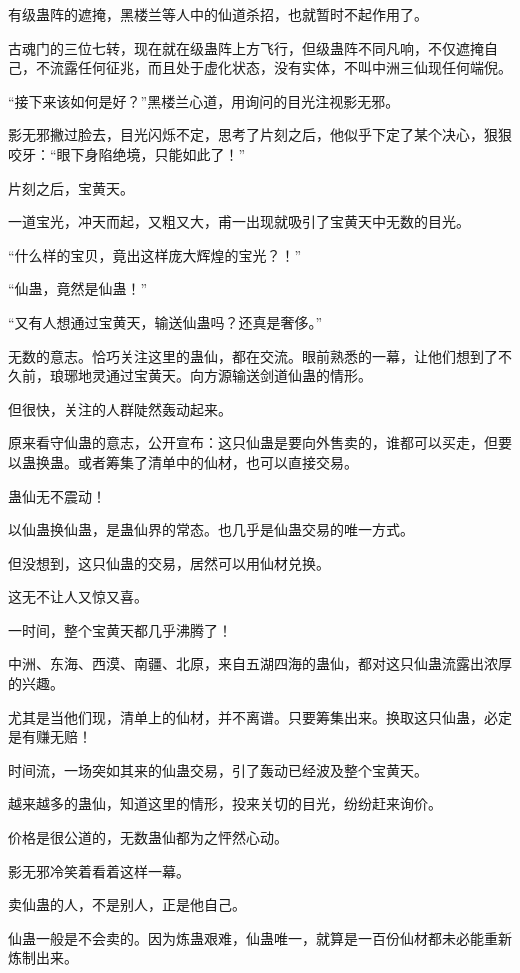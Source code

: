 \begin{this_body}
有级蛊阵的遮掩，黑楼兰等人中的仙道杀招，也就暂时不起作用了。

古魂门的三位七转，现在就在级蛊阵上方飞行，但级蛊阵不同凡响，不仅遮掩自己，不流露任何征兆，而且处于虚化状态，没有实体，不叫中洲三仙现任何端倪。

“接下来该如何是好？”黑楼兰心道，用询问的目光注视影无邪。

影无邪撇过脸去，目光闪烁不定，思考了片刻之后，他似乎下定了某个决心，狠狠咬牙：“眼下身陷绝境，只能如此了！”

片刻之后，宝黄天。

一道宝光，冲天而起，又粗又大，甫一出现就吸引了宝黄天中无数的目光。

“什么样的宝贝，竟出这样庞大辉煌的宝光？！”

“仙蛊，竟然是仙蛊！”

“又有人想通过宝黄天，输送仙蛊吗？还真是奢侈。”

无数的意志。恰巧关注这里的蛊仙，都在交流。眼前熟悉的一幕，让他们想到了不久前，琅琊地灵通过宝黄天。向方源输送剑道仙蛊的情形。

但很快，关注的人群陡然轰动起来。

原来看守仙蛊的意志，公开宣布：这只仙蛊是要向外售卖的，谁都可以买走，但要以蛊换蛊。或者筹集了清单中的仙材，也可以直接交易。

蛊仙无不震动！

以仙蛊换仙蛊，是蛊仙界的常态。也几乎是仙蛊交易的唯一方式。

但没想到，这只仙蛊的交易，居然可以用仙材兑换。

这无不让人又惊又喜。

一时间，整个宝黄天都几乎沸腾了！

中洲、东海、西漠、南疆、北原，来自五湖四海的蛊仙，都对这只仙蛊流露出浓厚的兴趣。

尤其是当他们现，清单上的仙材，并不离谱。只要筹集出来。换取这只仙蛊，必定是有赚无赔！

时间流，一场突如其来的仙蛊交易，引了轰动已经波及整个宝黄天。

越来越多的蛊仙，知道这里的情形，投来关切的目光，纷纷赶来询价。

价格是很公道的，无数蛊仙都为之怦然心动。

影无邪冷笑着看着这样一幕。

卖仙蛊的人，不是别人，正是他自己。

仙蛊一般是不会卖的。因为炼蛊艰难，仙蛊唯一，就算是一百份仙材都未必能重新炼制出来。


\end{this_body}
